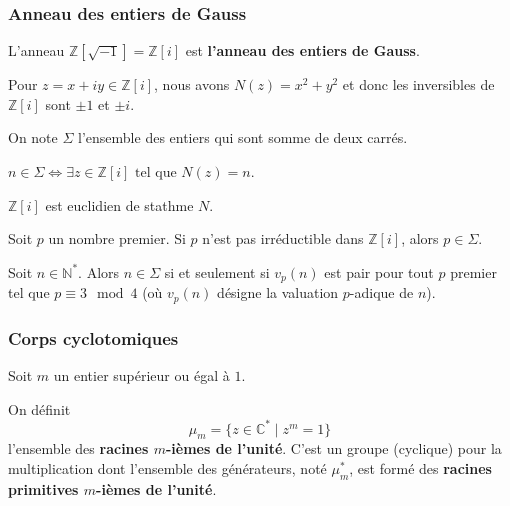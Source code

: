 	\subsubsection{Anneau des entiers de Gauss}
	
	\begin{definition}
		L'anneau $\mathbb{Z}[\sqrt{-1}] = \mathbb{Z}[i]$ est \textbf{l'anneau des entiers de Gauss}.
	\end{definition}
	
	\begin{example}
		Pour $z = x+iy \in \mathbb{Z}[i]$, nous avons $N(z) = x^2+y^2$ et donc les inversibles de $\mathbb{Z}[i]$ sont $\pm 1$ et $\pm i$.
	\end{example}
	
	
	\begin{notation}
		On note $\Sigma$ l'ensemble des entiers qui sont somme de deux carrés.
	\end{notation}
	
	\begin{remark}
		$n \in \Sigma \iff \exists z \in \mathbb{Z}[i] \text{ tel que } N(z)=n$.
	\end{remark}
	
	\begin{lemma}
		$\mathbb{Z}[i]$ est euclidien de stathme $N$.
	\end{lemma}
	
	\begin{lemma}
		Soit $p$ un nombre premier. Si $p$ n'est pas irréductible dans $\mathbb{Z}[i]$, alors $p \in \Sigma$.
	\end{lemma}
	
	
	\begin{theorem}
		Soit $n \in \mathbb{N}^*$. Alors $n \in \Sigma$ si et seulement si $v_p(n)$ est pair pour tout $p$ premier tel que $p \equiv 3 \mod 4$ (où $v_p(n)$ désigne la valuation $p$-adique de $n$).
	\end{theorem}
	
	\subsubsection{Corps cyclotomiques}
	
	Soit $m$ un entier supérieur ou égal à $1$.
	
	
	\begin{definition}
		On définit
		\[ \mu_m = \{ z \in \mathbb{C}^* \mid z^m = 1 \} \]
		l'ensemble des \textbf{racines $m$-ièmes de l'unité}. C'est un groupe (cyclique) pour la multiplication dont l'ensemble des générateurs, noté $\mu_m^*$, est formé des \textbf{racines primitives $m$-ièmes de l'unité}.
	\end{definition}
	

